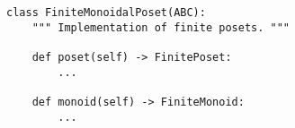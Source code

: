 \begin{verbatim}
class FiniteMonoidalPoset(ABC):
    """ Implementation of finite posets. """

    def poset(self) -> FinitePoset:
        ...

    def monoid(self) -> FiniteMonoid:
        ...
\end{verbatim}